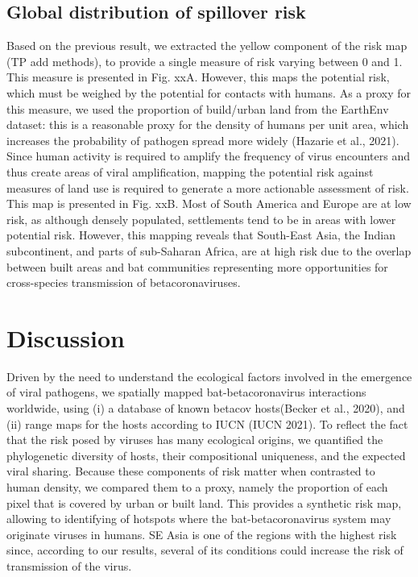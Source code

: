 \documentclass[10pt,oneside]{article}
\begin{document}
\hypertarget{global-distribution-of-spillover-risk}{%
\subsection{Global distribution of spillover
risk}\label{global-distribution-of-spillover-risk}}

Based on the previous result, we extracted the yellow component of the
risk map (TP add methods), to provide a single measure of risk varying
between 0 and 1. This measure is presented in Fig. xxA. However, this
maps the potential risk, which must be weighed by the potential for
contacts with humans. As a proxy for this measure, we used the
proportion of build/urban land from the EarthEnv dataset: this is a
reasonable proxy for the density of humans per unit area, which
increases the probability of pathogen spread more widely (Hazarie et
al., 2021). Since human activity is required to amplify the frequency of
virus encounters and thus create areas of viral amplification, mapping
the potential risk against measures of land use is required to generate
a more actionable assessment of risk. This map is presented in Fig. xxB.
Most of South America and Europe are at low risk, as although densely
populated, settlements tend to be in areas with lower potential risk.
However, this mapping reveals that South-East Asia, the Indian
subcontinent, and parts of sub-Saharan Africa, are at high risk due to
the overlap between built areas and bat communities representing more
opportunities for cross-species transmission of betacoronaviruses.

\hypertarget{discussion}{%
\section{Discussion}\label{discussion}}

Driven by the need to understand the ecological factors involved in the
emergence of viral pathogens, we spatially mapped bat-betacoronavirus
interactions worldwide, using (i) a database of known betacov
hosts(Becker et al., 2020), and (ii) range maps for the hosts according
to IUCN (IUCN 2021). To reflect the fact that the risk posed by viruses
has many ecological origins, we quantified the phylogenetic diversity of
hosts, their compositional uniqueness, and the expected viral sharing.
Because these components of risk matter when contrasted to human
density, we compared them to a proxy, namely the proportion of each
pixel that is covered by urban or built land. This provides a synthetic
risk map, allowing to identifying of hotspots where the
bat-betacoronavirus system may originate viruses in humans. SE Asia is
one of the regions with the highest risk since, according to our
results, several of its conditions could increase the risk of
transmission of the virus.
\end{document}
